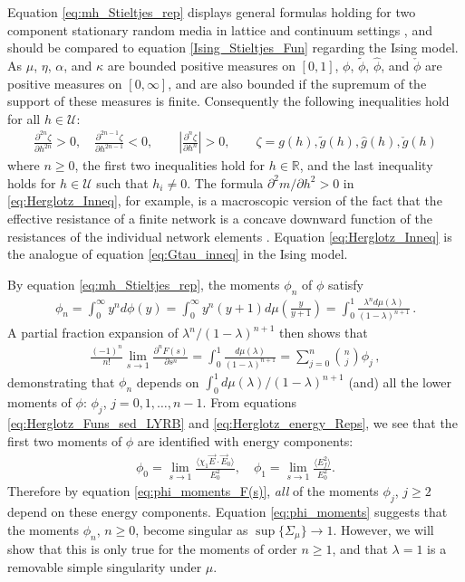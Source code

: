 \documentclass[english,12pt,jmp,graphicx]{revtex4-1}
\newcommand{\ph}{\hat{\phi}}
\begin{document}
%
Equation \eqref{eq:mh_Stieltjes_rep} displays general formulas
holding for two component stationary random media in lattice and
continuum settings \cite{Golden:PRL-3935}, and should be compared to
equation \eqref{Ising_Stieltjes_Fun} regarding the Ising model.       
As $\mu$, $\eta$, $\alpha$, and $\kappa$ are bounded positive measures on
$[0,1]$, $\phi$, $\tilde{\phi}$, $\ph$, and $\check{\phi}$ are positive
measures on $[0,\infty]$, and are also bounded if the supremum of the
support of these measures is finite. Consequently the following
inequalities hold for all $h\in\mathcal{U}$: 
\begin{align}\label{eq:Herglotz_Inneq}
  \frac{\partial^{2n}\zeta}{\partial h^{2n}}>0, \quad
  \frac{\partial^{2n-1}\zeta}{\partial h^{2n-1}}<0, \qquad
  \left|\frac{\partial^n\zeta}{\partial h^n}\right|>0, \qquad
  \zeta=g(h),\tilde{g}(h),\hat{g}(h),\check{g}(h)
\end{align}
%
where $n\geq0$, the first two inequalities hold for $h\in\mathbb{R}$, and
the last inequality holds for $h\in\mathcal{U}$ such that $h_i\neq0$. The
formula $\partial^2m/\partial h^2>0$ in \eqref{eq:Herglotz_Inneq}, for
example, is a macroscopic version of
the fact that the effective resistance of a finite network is a
concave downward function of the resistances of the individual network
elements \cite{Golden:JMP-5627}. Equation \eqref{eq:Herglotz_Inneq} is
the analogue of equation \eqref{eq:Gtau_inneq} in the Ising model.

By equation \eqref{eq:mh_Stieltjes_rep}, the moments $\phi_n$ of $\phi$
satisfy  
%
\begin{align}\label{eq:phi_moments}
  \phi_n=\int_0^\infty y^nd\phi(y)
    =\int_0^\infty y^n(y+1)d\mu\left(\frac{y}{y+1}\right)
    =\int_0^1\frac{\lambda^nd\mu(\lambda)}{(1-\lambda)^{n+1}}\,.
\end{align}
%
A partial fraction expansion of $\lambda^n/(1-\lambda)^{n+1}$ then shows that
%
\begin{align}\label{eq:phi_moments_F(s)}
  \frac{(-1)^n}{n!}\lim_{s\to1}\frac{\partial^nF(s)}{\partial s^n}=\int_0^1\frac{d\mu(\lambda)}{(1-\lambda)^{n+1}}
                                =\sum_{j=0}^n{n \choose j} \phi_j\,,
\end{align}
%
demonstrating that $\phi_n$ depends on $\int_0^1d\mu(\lambda)/(1-\lambda)^{n+1}$
(and) all the lower moments of $\phi$: $\phi_j$, $j=0,1,\ldots,n-1$.
From equations \eqref{eq:Herglotz_Funs_sed_LYRB} and
\eqref{eq:Herglotz_energy_Reps}, we see that the first two moments of
$\phi$ are identified with energy components:    
%
\begin{align}\label{eq:phi_energy_relations}
  \phi_0=\lim_{s\to1}\frac{\langle\chi_1\vec{E}\cdot\vec{E}_0\rangle}{E_0^2},   \quad
  \phi_1=\lim_{s\to1}\frac{\langle E_f^2\rangle}{E_0^2}.
\end{align}
%
Therefore by equation \eqref{eq:phi_moments_F(s)}, \emph{all} of the
moments $\phi_j$, $j\geq2$ depend on these energy components. Equation
\eqref{eq:phi_moments} suggests that the moments $\phi_n$, $n\geq0$, become
singular as $\sup\{\Sigma_\mu\}\to1$. However, we will show that this is only
true for the moments of order $n\geq1$, and that $\lambda=1$ is a removable
simple singularity under $\mu$. 
\end{document}
